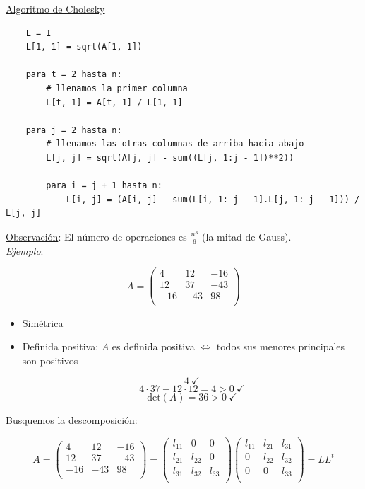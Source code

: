 \underline{Algoritmo de Cholesky}

\begin{verbatim}
    L = I
    L[1, 1] = sqrt(A[1, 1])

    para t = 2 hasta n:
        # llenamos la primer columna
        L[t, 1] = A[t, 1] / L[1, 1]
        
    para j = 2 hasta n:
        # llenamos las otras columnas de arriba hacia abajo
        L[j, j] = sqrt(A[j, j] - sum((L[j, 1:j - 1])**2))
        
        para i = j + 1 hasta n:
            L[i, j] = (A[i, j] - sum(L[i, 1: j - 1].L[j, 1: j - 1])) / L[j, j]
\end{verbatim}

\underline{Observaci\'on}: El n\'umero de operaciones es $\frac{n^{3}}{6}$ (la mitad de Gauss).\\

\textit{Ejemplo}:

$$A =
	\begin{pmatrix}
        4 & 12 & -16\\
        12 & 37 & -43\\
        -16 & -43 & 98\\
	\end{pmatrix}
$$

\begin{itemize}
	\item Sim\'etrica \checkmark
	
	\item Definida positiva: $A$ es definida positiva $\iff$ todos sus menores principales son positivos
	
	$$4\ \checkmark$$
	$$4\cdot37 - 12\cdot12 = 4 > 0\ \checkmark$$
	$$\text{det}(A) = 36 > 0\ \checkmark$$
\end{itemize}

Busquemos la descomposici\'on:

$$A =
	\begin{pmatrix}
        4 & 12 & -16\\
        12 & 37 & -43\\
        -16 & -43 & 98\\
	\end{pmatrix}
	=
	\begin{pmatrix}
        l_{11} & 0 & 0\\
        l_{21} & l_{22} & 0\\
        l_{31} & l_{32} & l_{33}\\
	\end{pmatrix}
	\begin{pmatrix}
        l_{11} & l_{21} & l_{31}\\
        0 & l_{22} & l_{32}\\
        0 & 0 & l_{33}\\
	\end{pmatrix}
	= LL^{t}
$$

